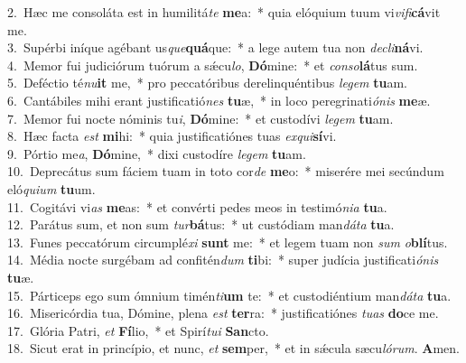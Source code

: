 {2.~}Hæc me consoláta est in humilitá\textit{te} \textbf{me}a:~* quia elóquium tuum vi\textit{vi}\textit{fi}\textbf{cá}vit me.\\
{3.~}Supérbi iníque agébant us\textit{que}\textbf{quá}que:~* a lege autem tua non \textit{de}\textit{cli}\textbf{ná}vi.\\
{4.~}Memor fui judiciórum tuórum a sǽcu\textit{lo}, \textbf{Dó}mine:~* et \textit{con}\textit{so}\textbf{lá}tus sum.\\
{5.~}Deféctio té\textit{nu}\textbf{it} me,~* pro peccatóribus derelinquéntibus \textit{le}\textit{gem} \textbf{tu}am.\\
{6.~}Cantábiles mihi erant justificatió\textit{nes} \textbf{tu}æ,~* in loco peregrinati\textit{ó}\textit{nis} \textbf{me}æ.\\
{7.~}Memor fui nocte nóminis tu\textit{i}, \textbf{Dó}mine:~* et custodívi \textit{le}\textit{gem} \textbf{tu}am.\\
{8.~}Hæc facta \textit{est} \textbf{mi}hi:~* quia justificatiónes tuas \textit{ex}\textit{qui}\textbf{sí}vi.\\
{9.~}Pórtio me\textit{a}, \textbf{Dó}mine,~* dixi custodíre \textit{le}\textit{gem} \textbf{tu}am.\\
{10.~}Deprecátus sum fáciem tuam in toto cor\textit{de} \textbf{me}o:~* miserére mei secúndum eló\textit{qui}\textit{um} \textbf{tu}um.\\
{11.~}Cogitávi vi\textit{as} \textbf{me}as:~* et convérti pedes meos in testimó\textit{ni}\textit{a} \textbf{tu}a.\\
{12.~}Parátus sum, et non sum \textit{tur}\textbf{bá}tus:~* ut custódiam man\textit{dá}\textit{ta} \textbf{tu}a.\\
{13.~}Funes peccatórum circumplé\textit{xi} \textbf{sunt} me:~* et legem tuam non \textit{sum} \textit{o}\textbf{blí}tus.\\
{14.~}Média nocte surgébam ad confitén\textit{dum} \textbf{ti}bi:~* super judícia justificati\textit{ó}\textit{nis} \textbf{tu}æ.\\
{15.~}Párticeps ego sum ómnium timén\textit{ti}\textbf{um} te:~* et custodiéntium man\textit{dá}\textit{ta} \textbf{tu}a.\\
{16.~}Misericórdia tua, Dómine, plena \textit{est} \textbf{ter}ra:~* justificatiónes \textit{tu}\textit{as} \textbf{do}ce me.\\
{17.~}Glória Patri, \textit{et} \textbf{Fí}lio,~* et Spirí\textit{tu}\textit{i} \textbf{San}cto.\\
{18.~}Sicut erat in princípio, et nunc, \textit{et} \textbf{sem}per,~* et in sǽcula sæcu\textit{ló}\textit{rum}. \textbf{A}men.\\

